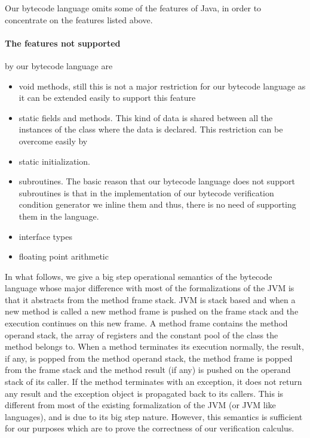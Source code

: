 

 Our bytecode language omits some of the features of Java, in order to concentrate on the features listed above.
\paragraph{The features not supported}  by our bytecode language are 
\begin{itemize} 
   \item void methods, still this is not a major restriction for our bytecode language  as it can be extended easily to support
         this feature
   \item static fields and methods. This kind of data is shared between all the instances of the class
         where the data is declared. This restriction can be overcome easily by    
   \item static initialization. 
   \item subroutines. The basic reason that our bytecode language does not support subroutines is that 
         in the implementation of our bytecode verification condition generator we inline them and thus, there is no need
	 of supporting them in the language.
   \item interface types   
   \item floating point arithmetic
 \end{itemize}

 

 In what follows, we give a big step operational semantics of the bytecode language whose major difference with most of the formalizations
 of the JVM is that it abstracts from the method frame stack. 
 JVM is stack based and when a new method is called a new method frame is pushed on the frame stack and the execution continues on this new frame.
 A method frame contains the method operand stack, the array of registers and the constant pool of the class the method belongs to.
 When a method terminates its execution normally, the result, if any, is popped from the method operand stack, the method frame is
 popped from the frame stack and the method result (if any) is pushed on the operand stack
 of its caller. If the method terminates with an exception, it does not return any result and the exception object is propagated back to its callers.
 This is different from most of the existing formalization of the JVM (or JVM like languages), and is due to its big step nature. However, this semantics
 is sufficient for our purposes which are to prove the correctness of our verification calculus.  


